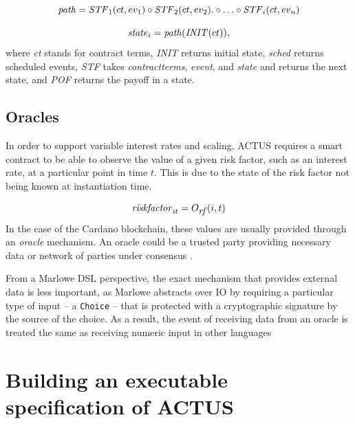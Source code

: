 \documentclass[runningheads]{llncs}
\newcommand{\ident}[1]{\mbox{\emph{#1}}}
\begin{document}
\newcommand{\STF}{\ident{STF}}
\noindent 
\begin{equation*}
\ident{path}=\STF_{1}(ct,ev_{1})\circ \STF_{2}(ct,ev_{2}).\circ\ldots\circ \STF_{i}(ct,ev_{n})
\end{equation*}

\noindent 
\begin{equation*}
\ident{state}_{i}=\ident{path}(\ident{INIT}(ct)),
\end{equation*}
\noindent
where \emph{ct} stands for contract terms, \emph{INIT} returns initial state, \emph{sched}
returns scheduled events, \emph{STF} takes \emph{contractterms}, \emph{event}, and \emph{state}
and returns the next state, and \emph{POF} returns the payoff in a state.

\subsection{Oracles}

In order to support variable interest rates and scaling, ACTUS requires
a smart contract to be able to observe the value of a given risk factor,
such as an interest rate, at a particular point in time $t$. This is due to the state of the risk factor not being known at instantiation
time. 

\noindent 
\begin{equation*}
\ident{riskfactor}_{it}=O_{\footnotesize\ident{rf}}(i,t)
\end{equation*}
\noindent
In the case of the Cardano blockchain, these values are usually
provided through an \emph{oracle} mechanism\cite{oracles}. An oracle
could be a trusted party providing necessary data or network of parties
under consensus \cite{de-oracles}. 

From a Marlowe DSL perspective,
the exact mechanism that provides external data is less important,
as Marlowe abstracts over IO by requiring a particular type of input -- a 
\texttt{Choice} -- that is protected with a cryptographic signature by the source of the choice.
As a result, the event of receiving data from an oracle is treated the
same as receiving numeric input in other languages

\section{Building an executable specification of ACTUS}
\label{executable}
\end{document}
